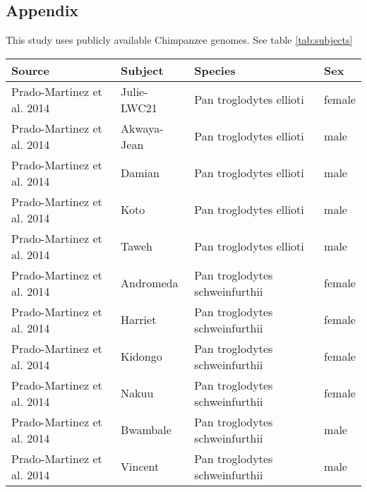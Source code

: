 
\subsection*{Appendix}

This study uses publicly available Chimpanzee genomes. See table \ref{tab:subjects}
\begin{table}[h]
\centering
\begin{tabular}{|l|l|l|l|}
\hline
\textbf{Source} & \textbf{Subject} & \textbf{Species} & \textbf{Sex} \\

\hline
Prado-Martinez et al. 2014  &  Julie-LWC21  &  Pan troglodytes ellioti  &  female  \\
Prado-Martinez et al. 2014  &  Akwaya-Jean  &  Pan troglodytes ellioti  &  male  \\
Prado-Martinez et al. 2014  &  Damian  &  Pan troglodytes ellioti  &  male  \\
Prado-Martinez et al. 2014  &  Koto  &  Pan troglodytes ellioti  &  male  \\
Prado-Martinez et al. 2014  &  Taweh  &  Pan troglodytes ellioti  &  male  \\
Prado-Martinez et al. 2014  &  Andromeda  &  Pan troglodytes schweinfurthii  &  female  \\
Prado-Martinez et al. 2014  &  Harriet  &  Pan troglodytes schweinfurthii  &  female  \\
Prado-Martinez et al. 2014  &  Kidongo  &  Pan troglodytes schweinfurthii  &  female  \\
Prado-Martinez et al. 2014  &  Nakuu  &  Pan troglodytes schweinfurthii  &  female  \\
Prado-Martinez et al. 2014  &  Bwambale  &  Pan troglodytes schweinfurthii  &  male  \\
Prado-Martinez et al. 2014  &  Vincent  &  Pan troglodytes schweinfurthii  &  male  \\

\end{tabular}
\end{table}
